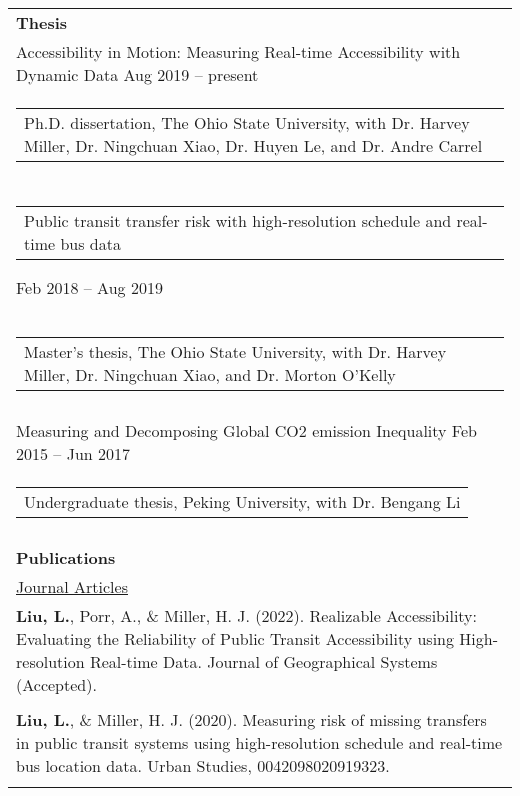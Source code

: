 \documentclass[letterpaper, 11pt]{article}
\begin{document}
\begin{longtable}{p{6.5in}}

{\textbf{Thesis}}\\

Accessibility in Motion: Measuring Real-time Accessibility with Dynamic Data \hfill Aug 2019 -- present \\ 
\begin{tabular}{p{5in}}
Ph.D. dissertation, The Ohio State University, with Dr. Harvey Miller, Dr. Ningchuan Xiao, Dr. Huyen Le, and Dr. Andre Carrel
\end{tabular} \\ \\

\begin{tabular}{p{5in}}
Public transit transfer risk with high-resolution schedule and real-time bus data 
\end{tabular} \hfill Feb 2018 -- Aug 2019 \\
\begin{tabular}{p{5in}}
Master's thesis, The Ohio State University, with Dr. Harvey Miller, Dr. Ningchuan Xiao, and Dr. Morton O'Kelly
\end{tabular} \\ \\


Measuring and Decomposing Global CO2 emission Inequality \hfill Feb 2015 -- Jun 2017 \\ 
\begin{tabular}{p{5in}}
Undergraduate thesis, Peking University, with Dr. Bengang Li
\end{tabular} \\ \\

\nohyphens{\textbf{Publications}} \\
\underline{Journal Articles} \\
\textbf{Liu, L.}, Porr, A., \& Miller, H. J. (2022). Realizable Accessibility: Evaluating the Reliability of Public Transit Accessibility using High-resolution Real-time Data. Journal of Geographical Systems (Accepted).\\\\

\textbf{Liu, L.}, \& Miller, H. J. (2020). Measuring risk of missing transfers in public transit systems using high-resolution schedule and real-time bus location data. Urban Studies, 0042098020919323.\\\\


\end{longtable}
\end{document}
